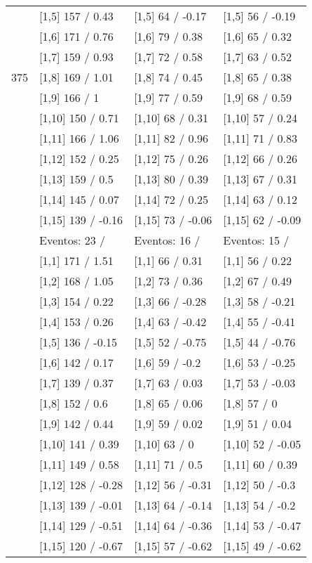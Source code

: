 \begin{table}
\begin{tabular}[t]{llll}
 & {}[1,5] 157  / 0.43 & {}[1,5] 64  / -0.17 & {}[1,5] 56  / -0.19\\
 & {}[1,6] 171  / 0.76 & {}[1,6] 79  / 0.38 & {}[1,6] 65  / 0.32\\
 & {}[1,7] 159  / 0.93 & {}[1,7] 72  / 0.58 & {}[1,7] 63  / 0.52\\
375 & {}[1,8] 169  / 1.01 & {}[1,8] 74  / 0.45 & {}[1,8] 65  / 0.38\\
\addlinespace
 & {}[1,9] 166  / 1 & {}[1,9] 77  / 0.59 & {}[1,9] 68  / 0.59\\
 & {}[1,10] 150  / 0.71 & {}[1,10] 68  / 0.31 & {}[1,10] 57  / 0.24\\
 & {}[1,11] 166  / 1.06 & {}[1,11] 82  / 0.96 & {}[1,11] 71  / 0.83\\
 & {}[1,12] 152  / 0.25 & {}[1,12] 75  / 0.26 & {}[1,12] 66  / 0.26\\
 & {}[1,13] 159  / 0.5 & {}[1,13] 80  / 0.39 & {}[1,13] 67  / 0.31\\
\addlinespace
 & {}[1,14] 145  / 0.07 & {}[1,14] 72  / 0.25 & {}[1,14] 63  / 0.12\\
 & {}[1,15] 139  / -0.16 & {}[1,15] 73  / -0.06 & {}[1,15] 62  / -0.09\\
 & Eventos:  23 / & Eventos:  16 / & Eventos:  15 /\\
 & {}[1,1] 171  / 1.51 & {}[1,1] 66  / 0.31 & {}[1,1] 56  / 0.22\\
 & {}[1,2] 168  / 1.05 & {}[1,2] 73  / 0.36 & {}[1,2] 67  / 0.49\\
\addlinespace
 & {}[1,3] 154  / 0.22 & {}[1,3] 66  / -0.28 & {}[1,3] 58  / -0.21\\
 & {}[1,4] 153  / 0.26 & {}[1,4] 63  / -0.42 & {}[1,4] 55  / -0.41\\
 & {}[1,5] 136  / -0.15 & {}[1,5] 52  / -0.75 & {}[1,5] 44  / -0.76\\
 & {}[1,6] 142  / 0.17 & {}[1,6] 59  / -0.2 & {}[1,6] 53  / -0.25\\
 & {}[1,7] 139  / 0.37 & {}[1,7] 63  / 0.03 & {}[1,7] 53  / -0.03\\
\addlinespace
500 & {}[1,8] 152  / 0.6 & {}[1,8] 65  / 0.06 & {}[1,8] 57  / 0\\
 & {}[1,9] 142  / 0.44 & {}[1,9] 59  / 0.02 & {}[1,9] 51  / 0.04\\
 & {}[1,10] 141  / 0.39 & {}[1,10] 63  / 0 & {}[1,10] 52  / -0.05\\
 & {}[1,11] 149  / 0.58 & {}[1,11] 71  / 0.5 & {}[1,11] 60  / 0.39\\
 & {}[1,12] 128  / -0.28 & {}[1,12] 56  / -0.31 & {}[1,12] 50  / -0.3\\
\addlinespace
 & {}[1,13] 139  / -0.01 & {}[1,13] 64  / -0.14 & {}[1,13] 54  / -0.2\\
 & {}[1,14] 129  / -0.51 & {}[1,14] 64  / -0.36 & {}[1,14] 53  / -0.47\\
 & {}[1,15] 120  / -0.67 & {}[1,15] 57  / -0.62 & {}[1,15] 49  / -0.62\\
\bottomrule
\end{tabular}
\end{table}
